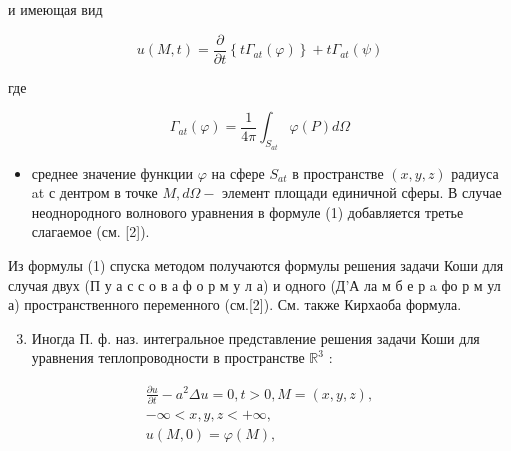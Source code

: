 \documentclass[10pt]{article}
\begin{document}
и имеющая вид



\[

u(M, t)=\frac{\partial}{\partial t}\left\{t \Gamma_{a t}(\varphi)\right\}+t \Gamma_{a t}(\psi)

\]



где



\[

\Gamma_{a t}(\varphi)=\frac{1}{4 \pi} \int_{S_{a t}} \varphi(P) d \Omega

\]



\begin{itemize}

  \item среднее значение функции $\varphi$ на сфере $S_{a t}$ в пространстве $(x, y, z)$ радиуса at с дентром в точке $M, d \Omega-$ элемент площади единичной сферы. В случае неоднородного волнового уравнения в формуле (1) добавляется третье слагаемое (см. [2]).

\end{itemize}



Из формулы (1) спуска методом получаются формулы решения задачи Коши для случая двух (П у а с с о в а ф о р м у л а) и одного (Д'А ла м б е р a фо р м ул а) пространственного переменного (см.[2]). См. также Кирхаоба формула.



\begin{enumerate}

  \setcounter{enumi}{2}

  \item Иногда П. ф. наз. интегральное представление решения задачи Коши для уравнения теплопроводности в пространстве $\mathbb{R}^{3}$ :

\end{enumerate}



\[

\begin{gathered}

\frac{\partial u}{\partial t}-a^{2} \Delta u=0, t>0, M=(x, y, z), \\

-\infty<x, y, z<+\infty, \\

u(M, 0)=\varphi(M),

\end{gathered}

\]
\end{document}

